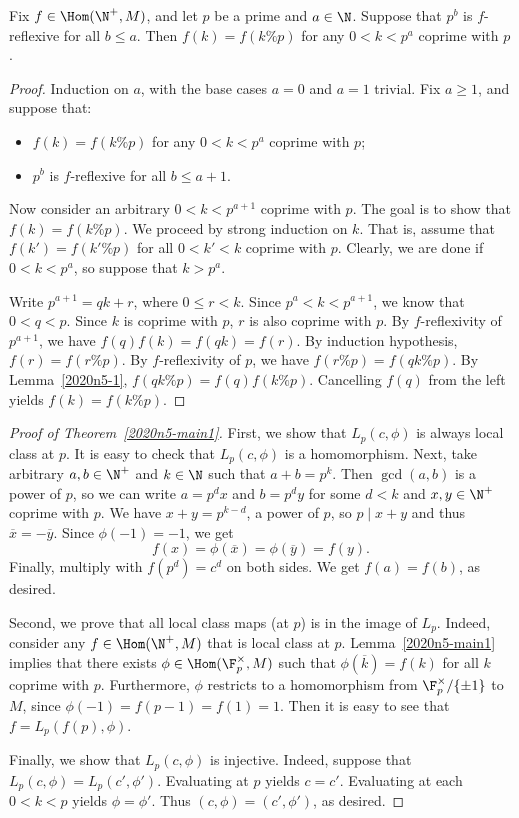 \begin{lemma}\label{2020n5-2}
Fix $f \in \Hom(\N^+, M)$, and let $p$ be a prime and $a \in \N$.
Suppose that $p^b$ is $f$-reflexive for all $b \leq a$.
Then $f(k) = f(k \% p)$ for any $0 < k < p^a$ coprime with $p$.
\end{lemma}
\begin{proof}
Induction on $a$, with the base cases $a = 0$ and $a = 1$ trivial.
Fix $a \geq 1$, and suppose that:
\begin{itemize}
    \item   $f(k) = f(k \% p)$ for any $0 < k < p^a$ coprime with $p$;
    \item   $p^b$ is $f$-reflexive for all $b \leq a + 1$.
\end{itemize}

Now consider an arbitrary $0 < k < p^{a + 1}$ coprime with $p$.
The goal is to show that $f(k) = f(k \% p)$.
We proceed by strong induction on $k$.
That is, assume that $f(k') = f(k' \% p)$ for all $0 < k' < k$ coprime with $p$.
Clearly, we are done if $0 < k < p^a$, so suppose that $k > p^a$.

Write $p^{a + 1} = qk + r$, where $0 \leq r < k$.
Since $p^a < k < p^{a + 1}$, we know that $0 < q < p$.
Since $k$ is coprime with $p$, $r$ is also coprime with $p$.
By $f$-reflexivity of $p^{a + 1}$, we have $f(q) f(k) = f(qk) = f(r)$.
By induction hypothesis, $f(r) = f(r \% p)$.
By $f$-reflexivity of $p$, we have $f(r \% p) = f(qk \% p)$.
By Lemma~\ref{2020n5-1}, $f(qk \% p) = f(q) f(k \% p)$.
Cancelling $f(q)$ from the left yields $f(k) = f(k \% p)$.
\end{proof}

\begin{proof}[Proof of Theorem~\ref{2020n5-main1}]
First, we show that $L_p(c, \phi)$ is always local class at $p$.
It is easy to check that $L_p(c, \phi)$ is a homomorphism.
Next, take arbitrary $a, b \in \N^+$ and $k \in \N$ such that $a + b = p^k$.
Then $\gcd(a, b)$ is a power of $p$, so we can write $a = p^d x$ and $b = p^d y$ for some $d < k$ and $x, y \in \N^+$ coprime with $p$.
We have $x + y = p^{k - d}$, a power of $p$, so $p \mid x + y$ and thus $\overline{x} = -\overline{y}$.
Since $\phi(-1) = -1$, we get
\[ f(x) = \phi(\overline{x}) = \phi(\overline{y}) = f(y). \]
Finally, multiply with $f(p^d) = c^d$ on both sides.
We get $f(a) = f(b)$, as desired.

Second, we prove that all local class maps (at $p$) is in the image of $L_p$.
Indeed, consider any $f \in \Hom(\N^+, M)$ that is local class at $p$.
Lemma~\ref{2020n5-main1} implies that there exists $\phi \in \Hom(\F_p^{\times}, M)$ such that $\phi(\overline{k}) = f(k)$ for all $k$ coprime with $p$.
Furthermore, $\phi$ restricts to a homomorphism from $\F_p^{\times}/\{\pm 1\}$ to $M$, since $\phi(-1) = f(p - 1) = f(1) = 1$.
Then it is easy to see that $f = L_p(f(p), \phi)$.

Finally, we show that $L_p(c, \phi)$ is injective.
Indeed, suppose that $L_p(c, \phi) = L_p(c', \phi')$.
Evaluating at $p$ yields $c = c'$.
Evaluating at each $0 < k < p$ yields $\phi = \phi'$.
Thus $(c, \phi) = (c', \phi')$, as desired.
\end{proof}

